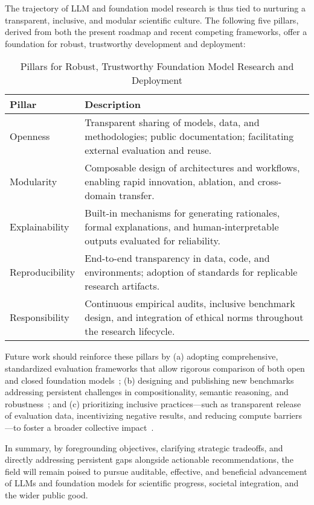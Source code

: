 \documentclass[sigconf]{acmart}
\begin{document}
The trajectory of LLM and foundation model research is thus tied to nurturing a transparent, inclusive, and modular scientific culture. The following five pillars, derived from both the present roadmap and recent competing frameworks, offer a foundation for robust, trustworthy development and deployment:

\begin{table*}[htbp]
\centering
\caption{Pillars for Robust, Trustworthy Foundation Model Research and Deployment}
\label{tab:pillars_future}
\begin{adjustbox}{max width=\textwidth}
\begin{tabular}{ll}
\toprule
\textbf{Pillar} & \textbf{Description} \\
\midrule
Openness        & Transparent sharing of models, data, and methodologies; public documentation; facilitating external evaluation and reuse. \\
Modularity      & Composable design of architectures and workflows, enabling rapid innovation, ablation, and cross-domain transfer. \\
Explainability  & Built-in mechanisms for generating rationales, formal explanations, and human-interpretable outputs evaluated for reliability. \\
Reproducibility & End-to-end transparency in data, code, and environments; adoption of standards for replicable research artifacts. \\
Responsibility  & Continuous empirical audits, inclusive benchmark design, and integration of ethical norms throughout the research lifecycle. \\
\bottomrule
\end{tabular}
\end{adjustbox}
\end{table*}

Future work should reinforce these pillars by (a) adopting comprehensive, standardized evaluation frameworks that allow rigorous comparison of both open and closed foundation models~\cite{ref94,ref95,ref96,ref97,ref101,ref105}; (b) designing and publishing new benchmarks addressing persistent challenges in compositionality, semantic reasoning, and robustness~\cite{ref94,ref96,ref97,ref99,ref105}; and (c) prioritizing inclusive practices---such as transparent release of evaluation data, incentivizing negative results, and reducing compute barriers---to foster a broader collective impact~\cite{ref92,ref107,ref108}.

In summary, by foregrounding objectives, clarifying strategic tradeoffs, and directly addressing persistent gaps alongside actionable recommendations, the field will remain poised to pursue auditable, effective, and beneficial advancement of LLMs and foundation models for scientific progress, societal integration, and the wider public good.



\end{document}
